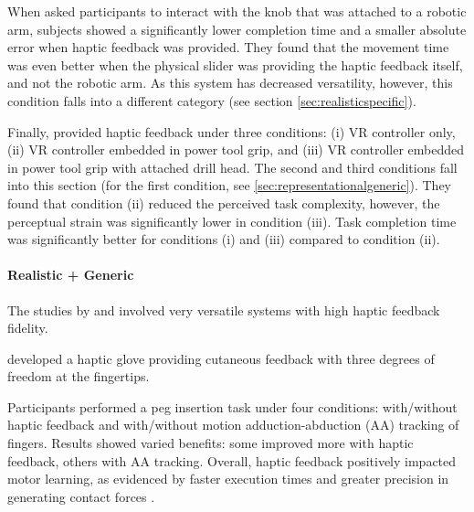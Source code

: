 When \cite{Dai2023} asked participants to interact with the knob that was attached to a robotic arm, subjects showed a significantly lower completion time and a smaller absolute error when haptic feedback was provided. They found that the movement time was even better when the physical slider was providing the haptic feedback itself, and not the robotic arm. As this system has decreased versatility, however, this condition falls into a different category (see section \ref{sec:realisticspecific}). 

Finally, \cite{Yang2023} provided haptic feedback under three conditions: (i) VR controller only, (ii) VR controller embedded in power tool grip, and (iii) VR controller embedded in power tool grip with attached drill head. The second and third conditions fall into this section (for the first condition, see \ref{sec:representationalgeneric}). They found that condition (ii) reduced the perceived task complexity, however, the perceptual strain was significantly lower in condition (iii). Task completion time was significantly better for conditions (i) and (iii) compared to condition (ii).


\paragraph{Realistic + Generic} \label{sec:realisticgeneric}
The studies by \cite{LeeY2019} and \cite{Oezen2022} involved very versatile systems with high haptic feedback fidelity. 

\cite{LeeY2019} developed a haptic glove providing cutaneous feedback with three degrees of freedom at the fingertips. 

Participants performed a peg insertion task under four conditions: with/without haptic feedback and with/without motion adduction-abduction (AA) tracking of fingers. Results showed varied benefits: some improved more with haptic feedback, others with AA tracking. Overall, haptic feedback positively impacted motor learning, as evidenced by faster execution times and greater precision in generating contact forces \cite{LeeY2019}.


